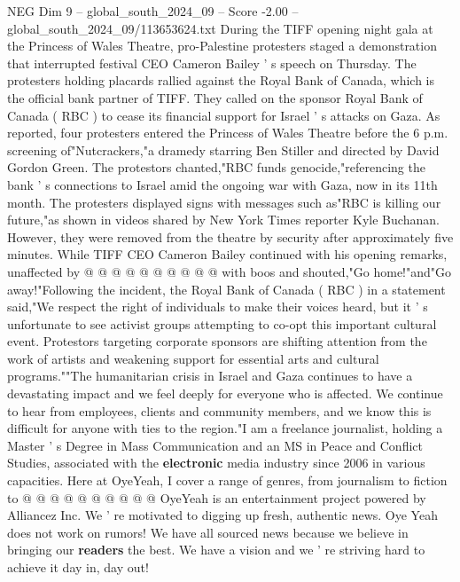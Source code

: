 \begin{textsample}{NEG Dim 9 – global\_south\_2024\_09 – Score -2.00 – global\_south\_2024\_09/113653624.txt}  \label{ex:f9_neg_198}
During the TIFF opening night gala at the Princess of Wales Theatre, pro-Palestine protesters staged a demonstration that interrupted festival CEO Cameron Bailey ' s speech on Thursday.
The protesters holding placards rallied against the Royal Bank of Canada, which is the official bank partner of TIFF.
They called on the sponsor Royal Bank of Canada ( RBC ) to cease its financial support for Israel ' s attacks on Gaza.
As reported, four protesters entered the Princess of Wales Theatre before the 6 p.m. screening of"Nutcrackers,"a dramedy starring Ben Stiller and directed by David Gordon Green.
The protestors chanted,"RBC funds genocide,"referencing the bank ' s connections to Israel amid the ongoing war with Gaza, now in its 11th month.
The protesters displayed signs with messages such as"RBC is killing our future,"as shown in videos shared by New York Times reporter Kyle Buchanan.
However, they were removed from the theatre by security after approximately five minutes.
While TIFF CEO Cameron Bailey continued with his opening remarks, unaffected by @ @ @ @ @ @ @ @ @ @ with boos and shouted,"Go home!"and"Go away!"Following the incident, the Royal Bank of Canada ( RBC ) in a statement said,"We respect the right of individuals to make their voices heard, but it ' s unfortunate to see activist groups attempting to co-opt this important cultural event.
Protestors targeting corporate sponsors are shifting attention from the work of artists and weakening support for essential arts and cultural programs.""The humanitarian crisis in Israel and Gaza continues to have a devastating impact and we feel deeply for everyone who is affected.
We continue to hear from employees, clients and community members, and we know this is difficult for anyone with ties to the region."I am a freelance journalist, holding a Master ' s Degree in Mass Communication and an MS in Peace and Conflict Studies, associated with the \textbf{electronic} media industry since 2006 in various capacities.
Here at OyeYeah, I cover a range of genres, from journalism to fiction to @ @ @ @ @ @ @ @ @ @ OyeYeah is an entertainment project powered by Alliancez Inc.
We ' re motivated to digging up fresh, authentic news.
Oye Yeah does not work on rumors!
We have all sourced news because we believe in bringing our \textbf{readers} the best.
We have a vision and we ' re striving hard to achieve it day in, day out!

\end{textsample}
